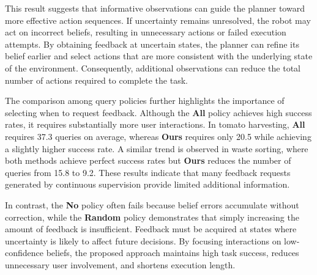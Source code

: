 This result suggests that informative observations can guide the planner toward more effective action sequences. If uncertainty remains unresolved, the robot may act on incorrect beliefs, resulting in unnecessary actions or failed execution attempts. By obtaining feedback at uncertain states, the planner can refine its belief earlier and select actions that are more consistent with the underlying state of the environment. Consequently, additional observations can reduce the total number of actions required to complete the task.

The comparison among query policies further highlights the importance of selecting when to request feedback. Although the \textbf{All} policy achieves high success rates, it requires substantially more user interactions. In tomato harvesting, \textbf{All} requires 37.3 queries on average, whereas \textbf{Ours} requires only 20.5 while achieving a slightly higher success rate. A similar trend is observed in waste sorting, where both methods achieve perfect success rates but \textbf{Ours} reduces the number of queries from 15.8 to 9.2. These results indicate that many feedback requests generated by continuous supervision provide limited additional information.

In contrast, the \textbf{No} policy often fails because belief errors accumulate without correction, while the \textbf{Random} policy demonstrates that simply increasing the amount of feedback is insufficient. Feedback must be acquired at states where uncertainty is likely to affect future decisions. By focusing interactions on low-confidence beliefs, the proposed approach maintains high task success, reduces unnecessary user involvement, and shortens execution length.


